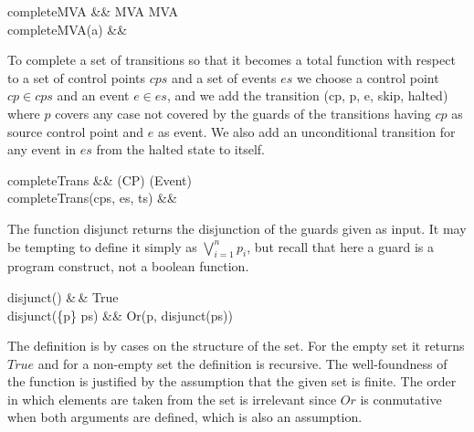 \documentclass[a4paper,10pt]{article}
\begin{document}
\begin{haskell}\label{def:completeMVA}
completeMVA &\ofType& MVA \to MVA\\
completeMVA(a) &\eqdef&
\end{haskell}

To complete a set of transitions so that it becomes a total function with respect to a set of control points
$cps$ and a set of events $es$ we choose a control point $cp \in cps$ and an event $e \in es$, and we add the
transition \<(cp, p, e, skip, halted)\> where $p$ covers any case not covered by the guards of the transitions
having $cp$ as source control point and $e$ as event.
We also add an unconditional transition for any event in $es$ from the halted state to itself.

\begin{haskell}\label{def:completeTrans}
completeTrans &\ofType& \powerset(CP) \sstimes \powerset(Event) \sstimes \Transitions \ssto \Transitions\\
completeTrans(cps, es, ts) &\eqdef&\relax
\end{haskell}

The function \<disjunct\> returns the disjunction of the guards given as input. It may be tempting to define
it simply as $\bigvee_{i=1}^n p_i$, but recall that here a guard is a program construct, not a boolean
function.

\begin{haskell}\label{def:disjunct}
disjunct(\emptyset) &\eqdef\,& True\\
disjunct(\{p\} \sscup ps) &\eqdef& Or(p, disjunct(ps))
\end{haskell}

The definition is by cases on the structure of the set. For the empty set it returns $True$ and for a
non-empty set the definition is recursive. The well-foundness of the function is justified by the assumption
that the given set is finite. The order in which elements are taken from the set is irrelevant since $Or$ is
conmutative when both arguments are defined, which is also an assumption.
\end{document}
